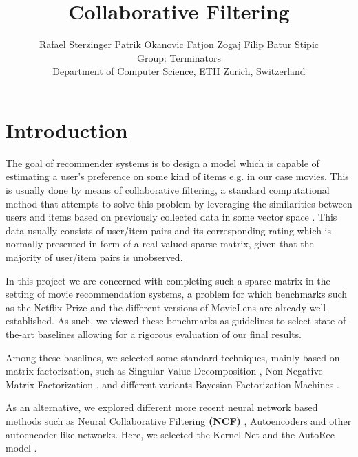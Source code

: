 \documentclass[10pt,conference,compsocconf]{IEEEtran}
\newcommand{\spacing}{\hspace{1cm}}
\begin{document}
    \title{Collaborative Filtering}

    \author{
    Rafael Sterzinger \spacing Patrik Okanovic \spacing Fatjon Zogaj \spacing Filip Batur Stipic\\
    Group: Terminators\\
    Department of Computer Science, ETH Zurich, Switzerland
    }

    \maketitle

    \begin{abstract}

    \end{abstract}


    \section{Introduction}

    The goal of recommender systems is to design a model which is capable of estimating a user's preference on some kind of items e.g. in our case movies.
    This is usually done by means of collaborative filtering, a standard computational method that attempts to solve this problem by leveraging the similarities between users and items based on previously collected data in some vector space \cite{CF_survey}.
    This data usually consists of user/item pairs and its corresponding rating which is normally presented in form of a real-valued sparse matrix, given that the majority of user/item pairs is unobserved.

    In this project we are concerned with completing such a sparse matrix in the setting of movie recommendation systems, a problem for which benchmarks such as the Netflix Prize \cite{Netflix} and the different versions of MovieLens \cite{Movielens} are already well-established.
    As such, we viewed these benchmarks as guidelines to select state-of-the-art baselines allowing for a rigorous evaluation of our final results.

    Among these baselines, we selected some standard techniques, mainly based on matrix factorization, such as Singular Value Decomposition \cite{svd}, Non-Negative Matrix Factorization \cite{6165290}, and different variants Bayesian Factorization Machines \cite{freudenthaler_bayesian_2011, salakhutdinov_bayesian_2008}.

    As an alternative, we explored different more recent neural network based methods such as Neural Collaborative Filtering \textbf{(NCF)} \cite{DBLP:journals/corr/abs-1708-05031}, Autoencoders \cite{inproceedings} and other autoencoder-like networks.
    Here, we selected the Kernel Net \cite{pmlr-v80-muller18a} and the AutoRec model \cite{inproceedings}.
\end{document}
